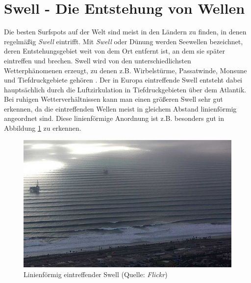 \section{Swell - Die Entstehung von Wellen}
Die besten Surfspots auf der Welt sind meist in den Ländern zu finden,
in denen regelmäßig \textit{Swell} eintrifft. Mit \textit{Swell} oder
Dünung werden Seewellen bezeichnet, deren Entstehungs\-gebiet weit von
dem Ort entfernt ist, an dem sie später eintreffen und brechen. Swell
wird von den unterschiedlichsten Wetter\-phänomenen erzeugt, zu denen
z.B. Wirbelstürme, Passatwinde, Monsune und Tiefdruckgebiete gehören
\cite[S.15]{storm_europe_1998}. Der in Europa eintreffende Swell
entsteht dabei hauptsächlich durch die Luftzirkulation in
Tiefdruckgebieten über dem Atlantik. Bei ruhigen Wetterverhältnissen
kann man einen größeren Swell sehr gut erkennen, da die eintreffenden
Wellen meist in gleichem Abstand linienförmig angeordnet sind. Diese
linienförmige Anordnung ist z.B. besonders gut in Abbildung
\ref{swell-lines} zu erkennen.

\begin{figure}[h]
 \includegraphics[width=\textwidth]{bilder/swell}
 \caption{Linienförmig eintreffender Swell (Quelle: \textit{Flickr})}
 \label{swell-lines}
\end{figure}


